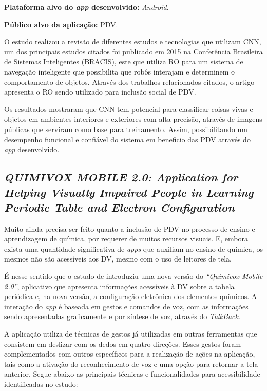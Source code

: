 \textbf{Plataforma alvo do \emph{app} desenvolvido:} \emph{Android}.

\textbf{Público alvo da aplicação:} PDV\@.

O estudo realizou a revisão de diferentes estudos e tecnologias que utilizam CNN, um dos principais estudos citados foi publicado em 2015 na Conferência Brasileira de Sistemas Inteligentes (BRACIS), este que utiliza RO para um sistema de navegação inteligente que possibilita que robôs interajam e determinem o comportamento de objetos.
Através dos trabalhos relacionados citados, o artigo apresenta o RO sendo utilizado para inclusão social de PDV\@.

Os resultados mostraram que CNN tem potencial para classificar coisas vivas e objetos em ambientes interiores e exteriores com alta precisão, através de imagens públicas que serviram como base para treinamento.
Assim, possibilitando um desempenho funcional e confiável do sistema em beneficio das PDV através do \emph{app} desenvolvido.

\subsection{\emph{QUIMIVOX MOBILE 2.0: Application for Helping Visually Impaired People in Learning Periodic Table and Electron Configuration}}

Muito ainda precisa ser feito quanto a inclusão de PDV no processo de ensino e aprendizagem de química, por requerer de muitos recursos visuais.
E, embora exista uma quantidade significativa de \emph{apps} que auxiliam no ensino de química, os mesmos não são acessíveis aos DV, mesmo com o uso de leitores de tela.

É nesse sentido que o estudo de  introduziu uma nova versão do \emph{``Quimivox Mobile 2.0''}, aplicativo que apresenta informações acessíveis à DV sobre a tabela periódica e, na nova versão, a configuração eletrônica dos elementos químicos.
A interação do \emph{app} é baseada em gestos e comandos de voz, com as informações sendo apresentadas graficamente e por síntese de voz, através do \emph{TalkBack}.

A aplicação utiliza de técnicas de gestos já utilizadas em outras ferramentas que consistem em deslizar com os dedos em quatro direções.
Esses gestos foram complementados com outros específicos para a realização de ações na aplicação, tais como a ativação do reconhecimento de voz e uma opção para retornar a tela anterior.
Segue abaixo as principais técnicas e funcionalidades para acessibilidade identificadas no estudo:

